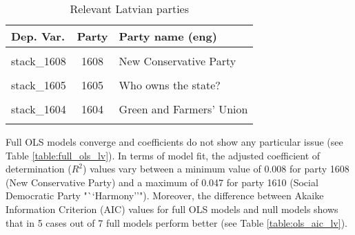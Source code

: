 \documentclass[
]{article}
\begin{document}
\begin{table}[!h]

\caption{\label{tab:unnamed-chunk-101}Relevant Latvian parties \label{table:relprty_tab_lv}}
\centering
\begin{tabular}[t]{lcl}
\toprule
Dep. Var. & Party & Party name (eng)\\
\midrule
\cellcolor{gray!6}{stack\_1611} & \cellcolor{gray!6}{1611} & \cellcolor{gray!6}{For Fatherland and Freedom - National Independence Movement of Latvia}\\
stack\_1608 & 1608 & New Conservative Party\\
\cellcolor{gray!6}{stack\_1609} & \cellcolor{gray!6}{1609} & \cellcolor{gray!6}{Development/For!}\\
stack\_1605 & 1605 & Who owns the state?\\
\cellcolor{gray!6}{stack\_1610} & \cellcolor{gray!6}{1610} & \cellcolor{gray!6}{Social Democratic Party ""Harmony""}\\
\addlinespace
stack\_1604 & 1604 & Green and Farmers' Union\\
\cellcolor{gray!6}{stack\_1616} & \cellcolor{gray!6}{1616} & \cellcolor{gray!6}{Unity}\\
\bottomrule
\end{tabular}
\end{table}

Full OLS models converge and coefficients do not show any particular issue (see Table
\ref{table:full_ols_lv}).
In terms of model fit, the adjusted coefficient of determination (\(R^2\)) values vary between
a minimum value of 0.008
for party 1608
(New Conservative Party)
and a maximum of 0.047
for party 1610
(Social Democratic Party "``Harmony''").
Moreover, the difference between Akaike Information Criterion (AIC) values for full OLS models and null
models shows that in 5 cases out of 7 full models perform better (see Table
\ref{table:ols_aic_lv}).
\end{document}
